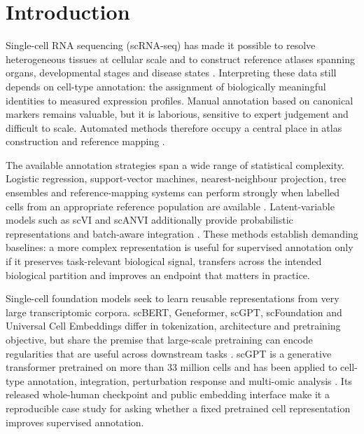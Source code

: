 \section{Introduction}

Single-cell RNA sequencing (scRNA-seq) has made it possible to resolve heterogeneous tissues at cellular scale and to construct reference atlases spanning organs, developmental stages and disease states \citep{Macosko2015,Zheng2017,Tanay2017,Regev2017,TabulaSapiens2022,LueckenTheis2019}. Interpreting these data still depends on cell-type annotation: the assignment of biologically meaningful identities to measured expression profiles. Manual annotation based on canonical markers remains valuable, but it is laborious, sensitive to expert judgement and difficult to scale. Automated methods therefore occupy a central place in atlas construction and reference mapping \citep{Aran2019,Kiselev2018,AlquicirayHernandez2019,Hao2021,Abdelaal2019,Pasquini2021}.

The available annotation strategies span a wide range of statistical complexity. Logistic regression, support-vector machines, nearest-neighbour projection, tree ensembles and reference-mapping systems can perform strongly when labelled cells from an appropriate reference population are available \citep{Aran2019,Kiselev2018,AlquicirayHernandez2019,DominguezConde2022}. Latent-variable models such as scVI and scANVI additionally provide probabilistic representations and batch-aware integration \citep{Lopez2018,Luecken2022}. These methods establish demanding baselines: a more complex representation is useful for supervised annotation only if it preserves task-relevant biological signal, transfers across the intended biological partition and improves an endpoint that matters in practice.

Single-cell foundation models seek to learn reusable representations from very large transcriptomic corpora. scBERT, Geneformer, scGPT, scFoundation and Universal Cell Embeddings differ in tokenization, architecture and pretraining objective, but share the premise that large-scale pretraining can encode regularities that are useful across downstream tasks \citep{Yang2022,Theodoris2023,Cui2024,Hao2024,Rosen2023}. scGPT is a generative transformer pretrained on more than 33 million cells and has been applied to cell-type annotation, integration, perturbation response and multi-omic analysis \citep{Cui2024}. Its released whole-human checkpoint and public embedding interface make it a reproducible case study for asking whether a fixed pretrained cell representation improves supervised annotation.

